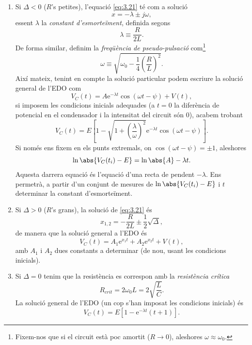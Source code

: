 \documentclass[a4paper,10.5pt]{report}
\begin{document}
\begin{enumerate}
	\item Si $\Delta < 0$ ($R$'s petites), l'equació \eqref{eq:3.21} té com a solució
	\begin{equation}
		x = - \lambda \pm j\omega,
	\end{equation}
	essent $\lambda$ la \textit{constant d'esmorteïment}, definida segons
	\begin{equation}
		\lambda \equiv \frac{R}{2L}.
	\end{equation}
	De forma similar, definim la \textit{freqüència de pseudo-pulsació} com\footnote{Fixem-nos que si el circuit està poc amortit ($R\rightarrow 0$), aleshores $\omega \approx \omega_0$.}
	\begin{equation}
		\omega \equiv \sqrt{\omega_0 - \frac{1}{4}\left(\frac{R}{L}\right)^2}. \label{eq:3.25}
	\end{equation}
	Així mateix, tenint en compte la solució particular podem escriure la solució general de l'EDO com
	\begin{equation}
		V_C(t) = A \mathrm{e}^{-\lambda t}\cos(\omega t - \psi) + V(t),
	\end{equation}
	si imposem les condicions inicials adequades (a $t=0$ la diferència de potencial en el condensador i la intensitat del circuit són 0), acabem trobant
	\begin{equation}
		\boxed{V_C(t) = E \left[1-\sqrt{1+\left(\frac{\lambda}{\omega}\right)^2}\mathrm{e}^{-\lambda t}\cos(\omega t - \psi)\right]}. 
	\end{equation}
	Si només ens fixem en els punts extremals, on $\cos(\omega t - \psi) = \pm 1$, aleshores
	\begin{equation}
		\ln\abs{V_C(t_i)-E} = \ln\abs{A}-\lambda t. \label{eq:3.28}
	\end{equation}
	Aquesta darrera equació és l'equació d'una recta de pendent $-\lambda$. Ens permetrà, a partir d'un conjunt de mesures de $\ln\abs{V_C(t_i)-E}$ i $t$ determinar la constant d'esmorteïment.
	\item Si $\Delta > 0$ ($R$'s grans), la solució de \eqref{eq:3.21} és
	\begin{equation}
		x_{1,2} = -\frac{R}{2L}\pm \frac{1}{2}\sqrt{\Delta},
	\end{equation}
	de manera que la solució general a l'EDO és
	\begin{equation}
		\boxed{V_C(t) = A_1 \mathrm{e}^{x_1t}+A_2\mathrm{e}^{x_2t}+V(t)},
	\end{equation}
	amb $A_1$ i $A_2$ dues constants a determinar (de nou, usant les condicions inicials).
	\item Si $\Delta = 0$ tenim que la resistència es correspon amb la \textit{resistència crítica}
	\begin{equation}
		R_{crit} = 2\omega_0L = 2\sqrt{\frac{L}{C}} \label{eq:3.31}.
	\end{equation}
	La solució general de l'EDO (un cop s'han imposat les condicions inicials) és
	\begin{equation}
		\boxed{V_C(t) = E[1-\mathrm{e}^{-\lambda t}(t+1)]}.
	\end{equation}
\end{enumerate}
\end{document}
